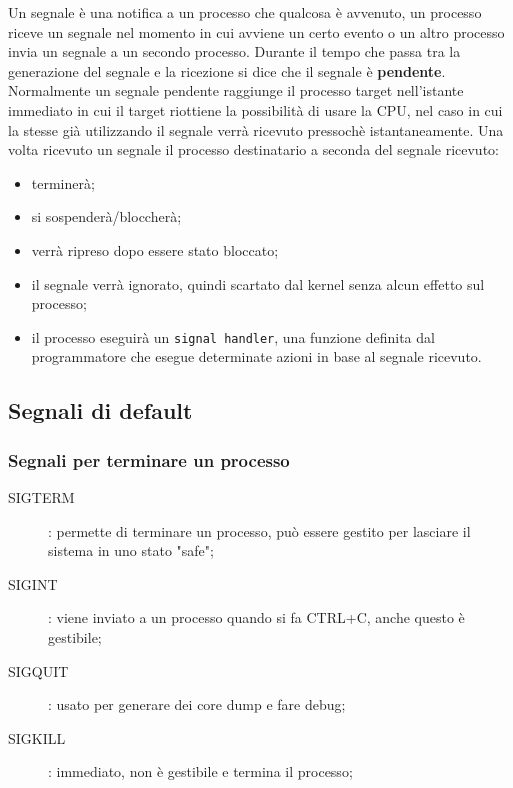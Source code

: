 \documentclass[a4paper, 12pt]{book}
\begin{document}
    Un segnale è una notifica a un processo che qualcosa 
    è avvenuto, un processo riceve un segnale nel momento 
    in cui avviene un certo evento o un altro processo 
    invia un segnale a un secondo processo. Durante il tempo 
    che passa tra la generazione del segnale e la ricezione
    si dice che il segnale è \textbf{pendente}. Normalmente 
    un segnale pendente raggiunge il processo target nell'istante 
    immediato in cui il target riottiene la possibilità 
    di usare la CPU, nel caso in cui la stesse già utilizzando 
    il segnale verrà ricevuto pressochè istantaneamente.
    Una volta ricevuto un segnale il processo destinatario 
    a seconda del segnale ricevuto:
    \begin{itemize}
        \item terminerà;
        \item si sospenderà/bloccherà;
        \item verrà ripreso dopo essere stato bloccato;
        \item il segnale verrà ignorato, quindi scartato dal kernel senza alcun effetto sul processo;
        \item il processo eseguirà un \verb|signal handler|, una funzione definita dal programmatore che esegue determinate azioni in base al segnale ricevuto.
    \end{itemize} 

    \subsection{Segnali di default}

    \subsubsection{Segnali per terminare un processo}

    \begin{description}
        \item[SIGTERM]: permette di terminare un processo, può essere gestito per lasciare il sistema in uno stato "safe";
        \item[SIGINT]: viene inviato a un processo quando si fa CTRL+C, anche questo è gestibile;
        \item[SIGQUIT]: usato per generare dei core dump e fare debug;
        \item[SIGKILL]: immediato, non è gestibile e termina il processo; 
    \end{description}
\end{document}
